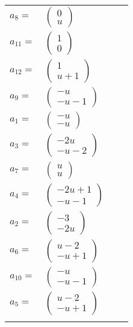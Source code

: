 \documentclass[1p]{elsarticle_modified}
\theoremstyle{definition}
\begin{document}
\begin{tabular}{m{7pt} m{180pt} m{7pt} m{180pt} }
\flushright $a_{8}=$&$\begin{pmatrix}0\\u\end{pmatrix}$ \\
\flushright $a_{11}=$&$\begin{pmatrix}1\\0\end{pmatrix}$ \\
\flushright $a_{12}=$&$\begin{pmatrix}1\\u+1\end{pmatrix}$ \\
\flushright $a_{9}=$&$\begin{pmatrix}- u\\- u-1\end{pmatrix}$ \\
\flushright $a_{1}=$&$\begin{pmatrix}- u\\- u\end{pmatrix}$ \\
\flushright $a_{3}=$&$\begin{pmatrix}-2 u\\- u-2\end{pmatrix}$ \\
\flushright $a_{7}=$&$\begin{pmatrix}u\\u\end{pmatrix}$ \\
\flushright $a_{4}=$&$\begin{pmatrix}-2 u+1\\- u-1\end{pmatrix}$ \\
\flushright $a_{2}=$&$\begin{pmatrix}-3\\-2 u\end{pmatrix}$ \\
\flushright $a_{6}=$&$\begin{pmatrix}u-2\\- u+1\end{pmatrix}$ \\
\flushright $a_{10}=$&$\begin{pmatrix}- u\\- u-1\end{pmatrix}$ \\
\flushright $a_{5}=$&$\begin{pmatrix}u-2\\- u+1\end{pmatrix}$\\&\end{tabular}
\end{document}
